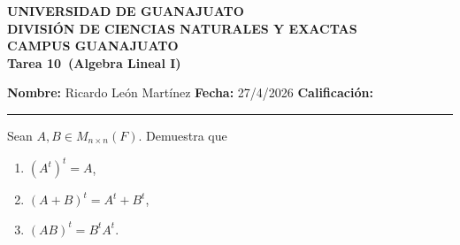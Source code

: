 \documentclass[12pt,a4paper]{article}
\newcommand{\alumno}{Ricardo León Martínez}
\newcommand{\materia}{Algebra Lineal I}
\newcommand{\tarea}{Tarea 10}
\newcommand{\fecha}{27/4/2026}
\begin{document}
    \begin{center}
        {\large\textbf{UNIVERSIDAD DE GUANAJUATO}}\\[0.3cm]
        {\normalsize\textbf{DIVISIÓN DE CIENCIAS NATURALES Y EXACTAS}}\\
        {\normalsize\textbf{CAMPUS GUANAJUATO}}\\[1cm]

        {\Large\textbf{\tarea\ (\materia)}}\\[1cm]
    \end{center}

    \noindent
    \textbf{Nombre:} \alumno 
    \hfill 
    \textbf{Fecha:} \fecha 
    \hfill 
    \textbf{Calificación:} \rule{3cm}{0.4pt}

    \vspace{0.3cm}

    \begin{mdframed}[style=mdpinkbox,frametitle={Ejercicio 1}]
        Sean $A,B\in M_{n\times n}(F)$. Demuestra que
        \begin{enumerate}
            \item[(a)] $(A^{t})^{t}=A$,
            \item[(b)] $(A+B)^{t}=A^{t}+B^{t}$,
            \item[(c)] $(AB)^{t}=B^{t}A^{t}$.  
        \end{enumerate}
    \end{mdframed}
\end{document}
